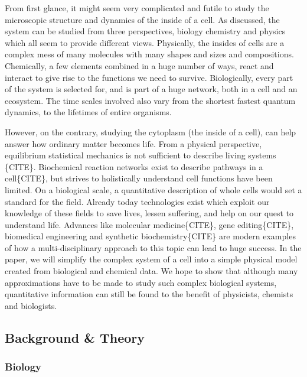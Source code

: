 \documentclass[draft, english]{volcanica-template}
\begin{document}
From first glance, it might seem very complicated and futile to study the microscopic structure and dynamics of the inside of a cell. As discussed, the system can be studied from three perspectives, biology chemistry and physics which all seem to provide different views. Physically, the insides of cells are a complex mess of many molecules with many shapes and sizes and compositions. Chemically, a few elements combined in a huge number of ways, react and interact to give rise to the functions we need to survive. Biologically, every part of the system is selected for, and is part of a huge network, both in a cell and an ecosystem. The time scales involved also vary from the shortest fastest quantum dynamics, to the lifetimes of entire organisms.

However, on the contrary, studying the cytoplasm (the inside of a cell), can help answer how ordinary matter becomes life. From a physical perspective, equilibrium statistical mechanics is not sufficient to describe living systems \{CITE\}. Biochemical reaction networks exist to describe pathways in a cell\{CITE\}, but strives to holistically understand cell functions have been limited. On a biological scale, a quantitative description of whole cells would set a standard for the field. Already today technologies exist which exploit our knowledge of these fields to save lives, lessen suffering, and help on our quest to understand life. Advances like molecular medicine\{CITE\}, gene editing\{CITE\}, biomedical engineering and synthetic biochemistry\{CITE\} are modern examples of how a multi-disciplinary approach to this topic can lead to huge success. In the paper, we will simplify the complex system of a cell into a simple physical model created from biological and chemical data. We hope to show that although many approximations have to be made to study such complex biological systems, quantitative information can still be found to the benefit of physicists, chemists and biologists.

\subsection{Background \& Theory}

\subsubsection{Biology}
\end{document}
